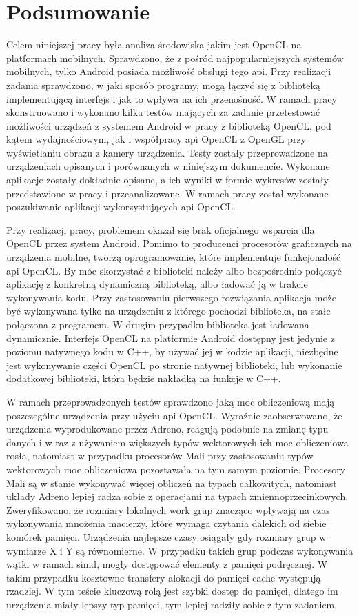 \section[Podsumowanie]{Podsumowanie}
Celem niniejszej pracy była analiza środowiska jakim jest OpenCL na platformach mobilnych. Sprawdzono, że z pośród najpopularniejszych systemów mobilnych, tylko Android posiada możliwość obsługi tego api. Przy realizacji zadania sprawdzono, w jaki sposób programy, mogą łączyć się z biblioteką implementującą interfejs i jak to wpływa na ich przenośność. W ramach pracy skonstruowano i wykonano kilka testów mających za zadanie przetestować możliwości urządzeń z systemem Android w pracy z biblioteką OpenCL, pod kątem wydajnościowym, jak i współpracy api OpenCL z OpenGL przy wyświetlaniu obrazu z kamery urządzenia. Testy zostały przeprowadzone na urządzeniach opisanych i porównanych w niniejszym dokumencie. Wykonane aplikacje zostały dokładnie opisane, a ich wyniki w formie wykresów zostały przedstawione w pracy i przeanalizowane. W ramach pracy został wykonane poszukiwanie aplikacji wykorzystujących api OpenCL.

Przy realizacji pracy, problemem okazał się brak oficjalnego wsparcia dla OpenCL przez system Android. Pomimo to producenci procesorów graficznych na urządzenia mobilne, tworzą oprogramowanie, które implementuje funkcjonalość api OpenCL. By móc skorzystać z biblioteki należy albo bezpośrednio połączyć aplikację z konkretną dynamiczną biblioteką, albo ładować ją w trakcie wykonywania kodu. Przy zastosowaniu pierwszego rozwiązania aplikacja może być wykonywana tylko na urządzeniu z którego pochodzi biblioteka, na stałe połączona z programem. W drugim przypadku biblioteka jest ładowana dynamicznie. Interfejs OpenCL na platformie Android dostępny jest jedynie z poziomu natywnego kodu w C++, by używać jej w kodzie aplikacji, niezbędne jest wykonywanie części OpenCL po stronie natywnej biblioteki, lub wykonanie dodatkowej biblioteki, która będzie nakładką na funkcje w C++. 

W ramach przeprowadzonych testów sprawdzono jaką moc obliczeniową mają poszczególne urządzenia przy użyciu api OpenCL. Wyraźnie zaobserwowano, że urządzenia wyprodukowane przez Adreno, reagują podobnie na zmianę typu danych i w raz z używaniem większych typów wektorowych ich moc obliczeniowa rosła, natomiast w przypadku procesorów Mali przy zastosowaniu typów wektorowych moc obliczeniowa pozostawała na tym samym poziomie. Procesory Mali są w stanie wykonywać więcej obliczeń na typach całkowitych, natomiast układy Adreno lepiej radza sobie z operacjami na typach zmiennoprzecinkowych. Zweryfikowano, że rozmiary lokalnych work grup znacząco wpływają na czas wykonywania mnożenia macierzy, które wymaga czytania dalekich od siebie komórek pamięci. Urządzenia najlepsze czasy osiągały gdy rozmiary grup w wymiarze X i Y są równomierne. W przypadku takich grup podczas wykonywania wątki w ramach simd, mogły dostępować elementy z pamięci podręcznej. W takim przypadku kosztowne transfery alokacji do pamięci cache występują rzadziej. W tym teście kluczową rolą jest szybki dostęp do pamięci, dlatego im urządzenia miały lepszy typ pamięci, tym lepiej radziły sobie z tym zadaniem. 

